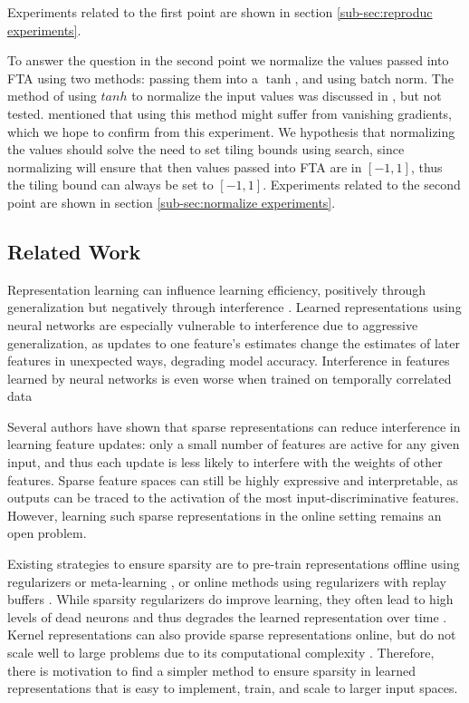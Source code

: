 \documentclass{article}
\begin{document}
Experiments related to the first point are shown in section \ref{sub-sec:reproduc experiments}.

To answer the question in the second point we normalize the values passed into FTA using two methods: passing them into a $\tanh$, and using batch norm.
The method of using $tanh$ to normalize the input values was discussed in \cite{pan2019fuzzy}, but not tested.
\cite{pan2019fuzzy} mentioned that using this method might suffer from vanishing gradients, which we hope to confirm from this experiment.
We hypothesis that normalizing the values should solve the need to set tiling bounds using search, since normalizing will ensure that then values passed into FTA are in $[-1, 1]$, thus the tiling bound can always be set to $[-1, 1]$.
Experiments related to the second point are shown in section \ref{sub-sec:normalize experiments}.


\subsection{Related Work} \label{sub-sec:related work}
Representation learning can influence learning efficiency, positively through generalization but negatively through interference \cite[]{bullinaria1995, iCaRL2016, le2017, liu2019}.
Learned representations using neural networks are especially vulnerable to interference due to aggressive generalization, as updates to one feature’s estimates change the estimates of later features in unexpected ways, degrading model accuracy.
Interference in features learned by neural networks is even worse when trained on temporally correlated data \cite[]{liu2020, bengio2020, zhang2022}

Several authors \cite[]{ghiassian2020,liu2019,javed2019,sutton2019}
have shown that sparse representations can reduce interference in learning feature updates: only a small number of features are active for any given input,
and thus each update is less likely to interfere with the weights of other features. Sparse feature spaces can still be highly expressive and interpretable,
as outputs can be traced to the activation of the most input-discriminative features.
However, learning such sparse representations in the online setting remains an open problem.

Existing strategies to ensure sparsity are to pre-train representations offline using regularizers \cite[]{liu2019} or meta-learning \cite{javed2019},
or online methods using regularizers with replay buffers \cite{sutton2019}. While sparsity regularizers do improve learning,
they often lead to high levels of dead neurons and thus degrades the learned representation over time \cite[]{sutton2019}.
Kernel representations can also provide sparse representations online, but do not scale well to large problems due to its computational complexity \cite[]{pan2019fuzzy}.
Therefore, there is motivation to find a simpler method to ensure sparsity in learned representations that is easy to implement, train, and scale to larger input spaces.
\end{document}
